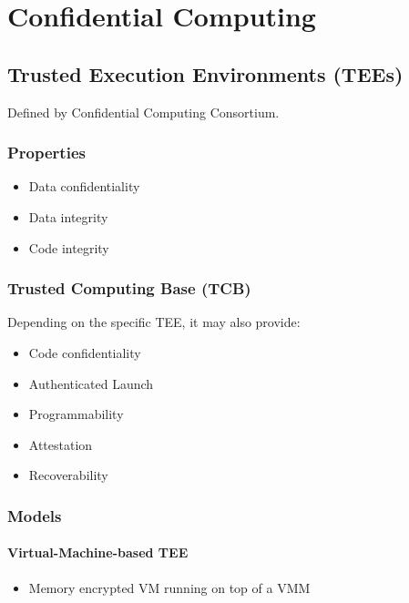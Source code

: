 \chapter{Confidential Computing}
\label{ch:confidential-computing}

\section{Trusted Execution Environments (TEEs)}
\label{sec:TEE}

Defined by Confidential Computing Consortium.

\subsection{Properties}

\begin{itemize}
  \item Data confidentiality
  \item Data integrity
  \item Code integrity
\end{itemize}

\subsection{Trusted Computing Base (TCB)}

Depending on the specific TEE, it may also provide:

\begin{itemize}
  \item Code confidentiality
  \item Authenticated Launch
  \item Programmability
  \item Attestation
  \item Recoverability
\end{itemize}

\subsection{Models}

\subsubsection{Virtual-Machine-based TEE}

\begin{itemize}
  \item Memory encrypted VM running on top of a VMM 
\end{itemize}

